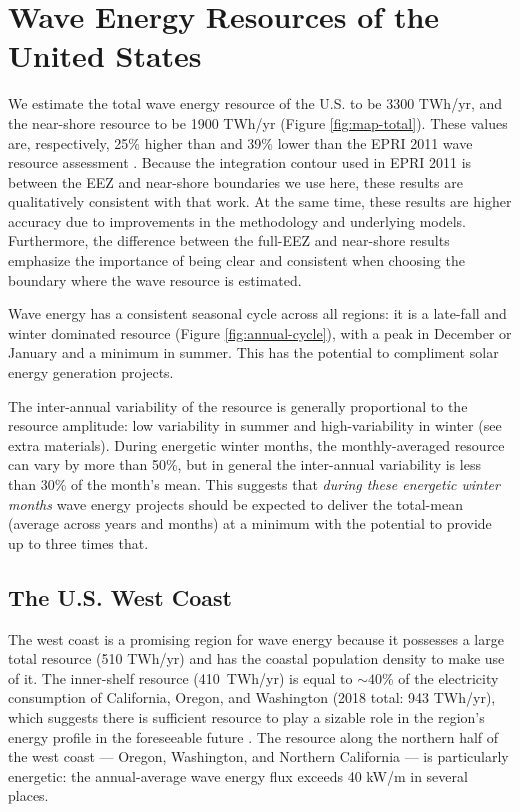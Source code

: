 \section{Wave Energy Resources of the United States}
\label{sec:results}

We estimate the total wave energy resource of the U.S. to be 3300 TWh/yr, and the near-shore resource to be 1900 TWh/yr (Figure \ref{fig:map-total}). 
These values are, respectively, 25\% higher than and 39\% lower than the EPRI 2011 wave resource assessment \citep[][]{EPRIwaveresource2011}. 
Because the integration contour used in EPRI 2011 is between the EEZ and near-shore boundaries we use here, these results are qualitatively consistent with that work. 
At the same time, these results are higher accuracy due to improvements in the methodology and underlying models. Furthermore, the difference between the full-EEZ and near-shore results emphasize the importance of being clear and consistent when choosing the boundary where the wave resource is estimated.

Wave energy has a consistent seasonal cycle across all regions: it is a late-fall and winter dominated resource (Figure \ref{fig:annual-cycle}), with a peak in December or January and a minimum in summer. This has the potential to compliment solar energy generation projects. 

The inter-annual variability of the resource is generally proportional to the resource amplitude: low variability in summer and high-variability in winter (see extra materials). During energetic winter months, the monthly-averaged resource can vary by more than 50\%, but in general the inter-annual variability is less than 30\% of the month's mean. This suggests that {\em during these energetic winter months} wave energy projects should be expected to deliver the total-mean (average across years and months) at a minimum with the potential to provide up to three times that.

\subsection{The U.S. West Coast}

The west coast is a promising region for wave energy because it possesses a large total resource (510 TWh/yr) and has the coastal population density to make use of it. The inner-shelf resource (410~TWh/yr) is equal to $\sim40$\% of the electricity consumption of California, Oregon, and Washington (2018 total: 943 TWh/yr), which suggests there is sufficient resource to play a sizable role in the region's energy profile in the foreseeable future \citep{energyinformationadministrationStateEnergyConsumption2020}. The resource along the northern half of the west coast — Oregon, Washington, and Northern California — is particularly energetic: the annual-average wave energy flux exceeds 40 kW/m in several places.

